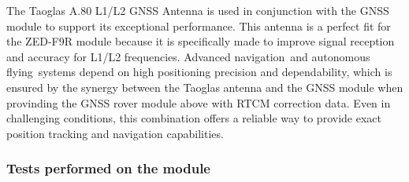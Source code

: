 \documentclass{article}
\begin{document}
The Taoglas A.80 L1/L2 GNSS Antenna is used in conjunction with the GNSS module to support its exceptional performance. This antenna is a perfect fit for the ZED-F9R module because it is specifically made to improve signal reception and accuracy for L1/L2 frequencies. Advanced navigation and 
autonomous flying systems depend on high positioning precision and dependability, which is ensured by the synergy between the Taoglas antenna and the GNSS module when provinding the GNSS rover module above with RTCM correction data. Even in challenging conditions, this combination offers a reliable way to provide exact position tracking and navigation capabilities.
\subsubsection*{Tests performed on the module}
\end{document}
